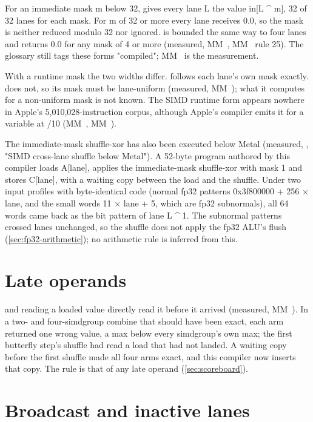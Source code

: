 For an immediate mask m below 32,  gives every lane L the value in{[}L \^{} m{]}, 32 of 32
lanes for each mask. For m of 32 or more every lane receives 0.0, so the mask is neither reduced modulo 32 nor ignored.  is bounded the same way to four lanes and returns 0.0 for any mask of 4
or more (measured, MM~, MM~ rule 25). The glossary still tags these forms "compiled"; MM~ is the measurement.

With a runtime mask the two widths differ.  follows each lane's own mask exactly.  does not, so its mask must be lane-uniform (measured, MM~); what it computes
for a non-uniform mask is not known. The SIMD runtime form appears nowhere in Apple's 5,010,028-instruction corpus, although Apple's compiler emits it for a
variable  at /10 (MM~, MM~).

The immediate-mask shuffle-xor has also been executed below Metal (measured, , "SIMD
cross-lane shuffle below Metal"). A 52-byte program authored by this compiler loads A{[}lane{]}, applies the immediate-mask shuffle-xor with mask 1 and stores C{[}lane{]},
with a waiting copy between the load and the shuffle. Under two input profiles with byte-identical code (normal fp32 patterns 0x3f800000 + 256 × lane,
and the small words 11 × lane + 5, which are fp32 subnormals), all 64 words came back as the bit pattern of lane L \^{} 1.
The subnormal patterns crossed lanes unchanged, so the shuffle does not apply the fp32 ALU's flush (\cref{sec:fp32-arithmetic});
no arithmetic rule is inferred from this.

\section{Late operands}\label{sec:cross-lane-operations-consumers}

 and  reading a loaded value directly read it before it arrived (measured, MM~).
In a two- and four-simdgroup combine that should have been exact, each arm returned one wrong value, a max below every
simdgroup's own max; the first butterfly step's shuffle had read a load that had not landed. A waiting copy before the
first shuffle made all four arms exact, and this compiler now inserts that copy. The rule is that of any late operand (\cref{sec:scoreboard}).

\section{Broadcast and inactive lanes}\label{sec:broadcast-inactive-lanes}

